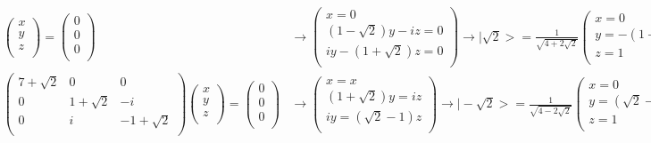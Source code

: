\documentclass[10pt]{article} %
\newcommand{\ket}[1]{\big|#1\big>}
\begin{document}
\begin{align*}
\begin{pmatrix}
    x\\
    y\\
    z\\
  \end{pmatrix}
  =
  \begin{pmatrix}
    0\\
    0\\
    0\\
  \end{pmatrix}
  &
  \rightarrow
  \begin{pmatrix}
    x = 0\\
    \left(1-\sqrt{2}\right)y -iz = 0\\
    iy - \left(1+\sqrt{2}\right)z = 0\\
  \end{pmatrix}
  \rightarrow
  \ket{\sqrt{2}} = \frac{1}{\sqrt{4+2\sqrt{2}}}
  \begin{pmatrix}
    x = 0\\
    y = -\left(1+\sqrt{2}\right)i\\
    z = 1\\
  \end{pmatrix}\\
  \begin{pmatrix}
    7+\sqrt{2} & 0 & 0\\
    0 & 1+\sqrt{2} & -i\\
    0 & i & -1+\sqrt{2}\\
  \end{pmatrix}
  \begin{pmatrix}
    x\\
    y\\
    z\\
  \end{pmatrix}
  =
  \begin{pmatrix}
    0\\
    0\\
    0\\
  \end{pmatrix}
  &
  \rightarrow
  \begin{pmatrix}
    x = x\\
    \left(1+\sqrt{2}\right)y = iz\\
    iy = \left(\sqrt{2}-1\right)z\\
  \end{pmatrix}
  \rightarrow
  \ket{-\sqrt{2}} = \frac{1}{\sqrt{4-2\sqrt{2}}}
  \begin{pmatrix}
    x = 0\\
    y = \left(\sqrt{2}-1\right)i\\
    z = 1\\
  \end{pmatrix}
\end{align*}
\end{document}
